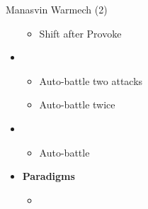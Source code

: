 \documentclass{report}
\begin{document}
\begin{battle}{Manasvin Warmech (2)}
\begin{itemize}
\begin{itemize}
        \item Shift after Provoke
    \end{itemize}
    \item \third
    \begin{itemize}
        \item Auto-battle two attacks
        \item Auto-battle twice
    \end{itemize}
    \item \fourth
    \begin{itemize}
        \item Auto-battle
    \end{itemize}
\end{itemize}
\end{battle}

\begin{menu}
\begin{itemize}
    \item \textbf{Paradigms}
    \begin{itemize}
        \item {}%
{\paradigmline{\textit{\com}}{\textit{\rav}}{\textit{\rav}}}%
{\paradigmline{\com}{\med}{\rav}}%
{\paradigmline{[\rav]}{\rav}{\rav}}%
{\paradigmline{[\rav]}{\rav}{\rav}}%
{\paradigmline{[\com]}{\rav}{\rav}}
    \end{itemize}
\end{itemize}
\end{menu}

\renewcommand{\first}{[1] Relentless Assault (\com/\rav/\rav)}
\renewcommand{\second}{[2] Diversity (\com/\med/\rav)}
\renewcommand{\third}{[3] Tri-Disaster (\rav/\rav/\rav)}
\renewcommand{\fourth}{[4] Tri-Disaster (\rav/\rav/\rav)}
\renewcommand{\fifth}{[5] Relentless Assault (\com/\rav/\rav)}

\end{document}
